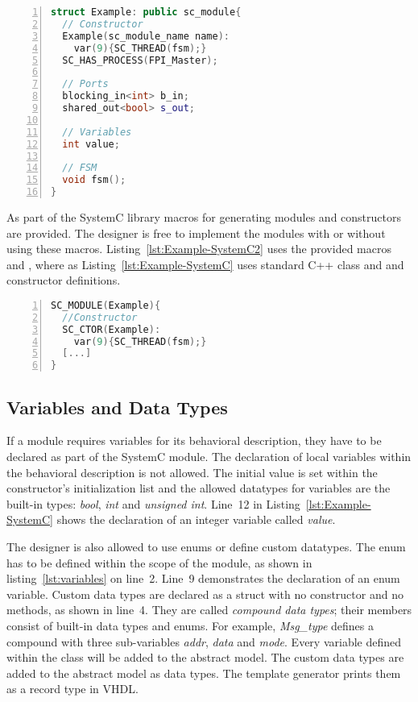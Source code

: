\begin{lstlisting}[language=C++,
caption={Example of a SystemC module},
label={lst:Example-SystemC},
numbers=left,
captionpos=b,   
basicstyle={\footnotesize},
xleftmargin=5.0ex]
struct Example: public sc_module{
  // Constructor
  Example(sc_module_name name):
    var(9){SC_THREAD(fsm);}
  SC_HAS_PROCESS(FPI_Master);
  
  // Ports
  blocking_in<int> b_in;
  shared_out<bool> s_out;
  
  // Variables
  int value;

  // FSM
  void fsm();
}
\end{lstlisting}
As part of the SystemC library macros for generating modules and
constructors are provided. %
The designer is free to implement the modules with or without using
these macros. %
Listing~\ref{lst:Example-SystemC2} uses the provided macros
 and , where as
Listing~\ref{lst:Example-SystemC} uses standard C++ class and and
constructor definitions. %

\begin{lstlisting}[language=C++,
caption={Example of a SystemC module},
label={lst:Example-SystemC2},
numbers=left,
captionpos=b,   
basicstyle={\footnotesize},
xleftmargin=5.0ex]
SC_MODULE(Example){
  //Constructor
  SC_CTOR(Example):
    var(9){SC_THREAD(fsm);}
  [...]
}
\end{lstlisting}

\subsection{Variables and Data Types}
If a module requires variables for its behavioral description, they
have to be declared as part of the SystemC module. %
The declaration of local variables within the behavioral description
is not allowed. %
The initial value is set within the constructor's initialization list
and the allowed datatypes for variables are the built-in types:
\textit{bool}, \textit{int} and \textit{unsigned int}. %
Line~12 in Listing~\ref{lst:Example-SystemC} shows the declaration of
an integer variable called \textit{value}. %

The designer is also allowed to use enums or define custom
datatypes. %
The enum has to be defined within the scope of the module, as shown in
listing~\ref{lst:variables} on line~2. %
Line~9 demonstrates the declaration of an enum variable. %
Custom data types are declared as a struct with no constructor and no
methods, as shown in line~4. %
They are called \textit{compound data types}; their members consist of
built-in data types and enums. %
For example, \textit{Msg\_type} defines a compound with three
sub-variables \textit{addr}, \textit{data} and \textit{mode}. %
Every variable defined within the class will be added to the abstract
model. %
The custom data types are added to the abstract model as data types. %
The template generator prints them as a record type in VHDL. %

